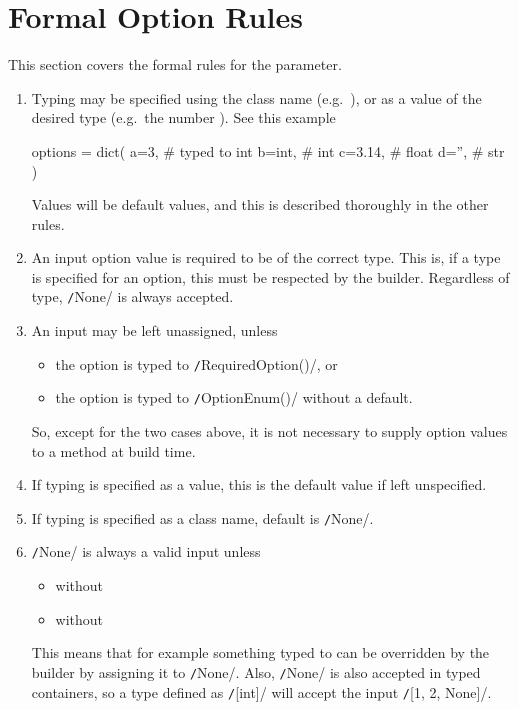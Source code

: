 \section{Formal Option Rules}
\label{sec:formal_options}
This section covers the formal rules for the \options parameter.
\begin{enumerate}

\item Typing may be specified using the class name
  (e.g.\ ), or as a value of the desired type
  (e.g.\ the number ).  See this example
  \begin{python}
options = dict(
    a=3,     # typed to int
    b=int,   #          int
    c=3.14,  #          float
    d='',    #          str
)
  \end{python}
  Values will be default values, and this is described thoroughly in
  the other rules.

 \item An input option value is required to be of the correct type.
   This is, if a type is specified for an option, this must be
   respected by the builder.  Regardless of type,
   \texttt/None/ is always accepted.

\item An input may be left unassigned, unless
  \begin{itemize}
  \item the option is typed to \texttt/RequiredOption()/, or
  \item the option is typed to \texttt/OptionEnum()/ without a default.
  \end{itemize}
  So, except for the two cases above, it is not necessary to supply
  option values to a method at build time.

\item If typing is specified as a value, this is the default value if
  left unspecified.

\item If typing is specified as a class name, default is
  \texttt/None/.

\item \texttt/None/ is always a valid input unless
  \begin{itemize}
  \item {} without 
  \item {} without 
  \end{itemize}
  This means that for example something typed to  can be
  overridden by the builder by assigning it to
  \texttt/None/.  Also, \texttt/None/ is also
  accepted in typed containers, so a type defined as
  \texttt/[int]/ will accept the input
  \texttt/[1, 2, None]/.


\end{enumerate}
